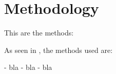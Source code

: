 \section{Methodology}

This are the methods:

As seen in \cite{example_ref}, the methods used are:

- bla
- bla
- bla

